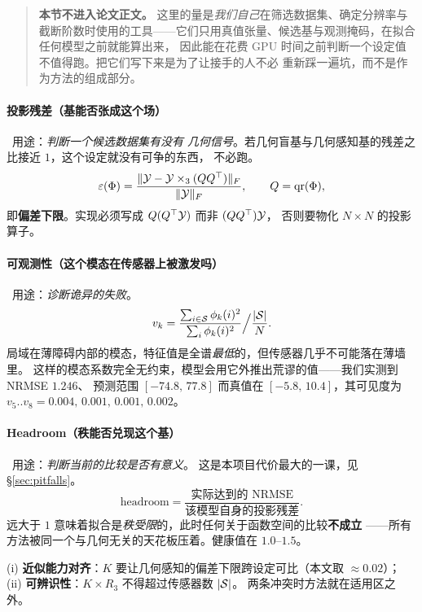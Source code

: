 \documentclass[11pt,a4paper]{article}
\begin{document}
\begin{quote}\small
\textbf{本节不进入论文正文。} 这里的量是\emph{我们自己}在筛选数据集、确定分辨率与
截断阶数时使用的工具——它们只用真值张量、候选基与观测掩码，在拟合任何模型之前就能算出来，
因此能在花费 GPU 时间之前判断一个设定值不值得跑。把它们写下来是为了让接手的人不必
重新踩一遍坑，而不是作为方法的组成部分。
\end{quote}

\paragraph{投影残差（基能否张成这个场）}\ 用途：\emph{判断一个候选数据集有没有
几何信号}。若几何盲基与几何感知基的残差之比接近 $1$，这个设定就没有可争的东西，
不必跑。
\begin{equation}
\varepsilon(\Phi)=\frac{\lVert \mathcal{Y}-\mathcal{Y}\times_3(QQ^\top) \rVert_F}{\lVert \mathcal{Y} \rVert_F},
\qquad Q=\mathrm{qr}(\Phi),
\end{equation}
即\textbf{偏差下限}。实现必须写成 $Q(Q^\top\mathcal{Y})$ 而非 $(QQ^\top)\mathcal{Y}$，
否则要物化 $N\times N$ 的投影算子。

\paragraph{可观测性（这个模态在传感器上被激发吗）}\ 用途：\emph{诊断诡异的失败}。
\begin{equation}
v_k=\frac{\sum_{i\in\mathcal{S}}\phi_k(i)^2}{\sum_i\phi_k(i)^2}\Big/\frac{|\mathcal{S}|}{N}.
\end{equation}
局域在薄障碍内部的模态，特征值是全谱\emph{最低}的，但传感器几乎不可能落在薄墙里。
这样的模态系数完全无约束，模型会用它外推出荒谬的值——我们实测到 NRMSE $1.246$、
预测范围 $[-74.8,\,77.8]$ 而真值在 $[-5.8,\,10.4]$，其可见度为
$v_5..v_8=0.004,\,0.001,\,0.001,\,0.002$。

\paragraph{Headroom（秩能否兑现这个基）}\ 用途：\emph{判断当前的比较是否有意义}。
这是本项目代价最大的一课，见 \S\ref{sec:pitfalls}。
\begin{equation}
\text{headroom}=\frac{\text{实际达到的 NRMSE}}{\text{该模型自身的投影残差}}.
\end{equation}
远大于 $1$ 意味着拟合是\emph{秩受限}的，此时任何关于函数空间的比较\textbf{不成立}
——所有方法被同一个与几何无关的天花板压着。健康值在 $1.0$–$1.5$。

\begin{principle}
\label{prin:cutoff}
(i) \textbf{近似能力对齐}：$K$ 要让几何感知的偏差下限跨设定可比（本文取 $\approx0.02$）；
(ii) \textbf{可辨识性}：$K\times R_3$ 不得超过传感器数 $|\mathcal{S}|$。
两条冲突时方法就在适用区之外。
\end{principle}
\end{document}
